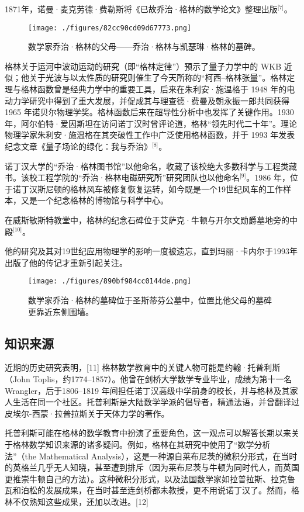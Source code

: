 1871年，诺曼·麦克劳德·费勒斯将《已故乔治·格林的数学论文》整理出版\(^\text{[7]}\)。
\begin{figure}[ht]
\centering
\texttt{[image: ./figures/82cc90cd09d67773.png]}
\caption{数学家乔治·格林的父母——乔治·格林与凯瑟琳·格林的墓碑。} \label{fig_QZgl_6}
\end{figure}
格林关于运河中波动运动的研究（即“格林定律”）预示了量子力学中的 WKB 近似；他关于光波与以太性质的研究则催生了今天所称的“柯西–格林张量”。格林定理与格林函数曾是经典力学中的重要工具，后来在朱利安·施温格于 1948 年的电动力学研究中得到了重大发展，并促成其与理查德·费曼及朝永振一郎共同获得 1965 年诺贝尔物理学奖。格林函数后来在超导性分析中也发挥了关键作用。1930 年，阿尔伯特·爱因斯坦在访问诺丁汉时曾评论道，格林“领先时代二十年”。理论物理学家朱利安·施温格在其突破性工作中广泛使用格林函数，并于 1993 年发表纪念文章《量子场论的绿化：我与乔治》\(^\text{[8]}\)。

诺丁汉大学的“乔治·格林图书馆”以他命名，收藏了该校绝大多数科学与工程类藏书。该校工程学院的“乔治·格林电磁研究所”研究团队也以他命名\(^\text{[9]}\)。1986 年，位于诺丁汉斯尼顿的格林风车被修复恢复运转，如今既是一个19世纪风车的工作样本，又是一个纪念格林的博物馆与科学中心。

在威斯敏斯特教堂中，格林的纪念石碑位于艾萨克·牛顿与开尔文勋爵墓地旁的中殿\(^\text{[10]}\)。

他的研究及其对19世纪应用物理学的影响一度被遗忘，直到玛丽·卡内尔于1993年出版了他的传记才重新引起关注。
\begin{figure}[ht]
\centering
\texttt{[image: ./figures/890bf984cc0144de.png]}
\caption{数学家乔治·格林的墓碑位于圣斯蒂芬公墓中，位置比他父母的墓碑更靠近东侧围墙。} \label{fig_QZgl_5}
\end{figure}
\subsection{知识来源}
近期的历史研究表明，[11] 格林数学教育中的关键人物可能是约翰·托普利斯（John Toplis，约1774–1857）。他曾在剑桥大学数学专业毕业，成绩为第十一名 Wrangler，后于1806–1819 年间担任诺丁汉高级中学前身的校长，并与格林及其家人生活在同一个社区。托普利斯是大陆数学学派的倡导者，精通法语，并曾翻译过皮埃尔-西蒙·拉普拉斯关于天体力学的著作。

托普利斯可能在格林的数学教育中扮演了重要角色，这一观点可以解答长期以来关于格林数学知识来源的诸多疑问。例如，格林在其研究中使用了“数学分析法”（the Mathematical Analysis），这是一种源自莱布尼茨的微积分形式，在当时的英格兰几乎无人知晓，甚至遭到排斥（因为莱布尼茨与牛顿为同时代人，而英国更推崇牛顿自己的方法）。这种微积分形式，以及法国数学家如拉普拉斯、拉克鲁瓦和泊松的发展成果，在当时甚至连剑桥都未教授，更不用说诺丁汉了。然而，格林不仅熟知这些成果，还加以改进。[12]
